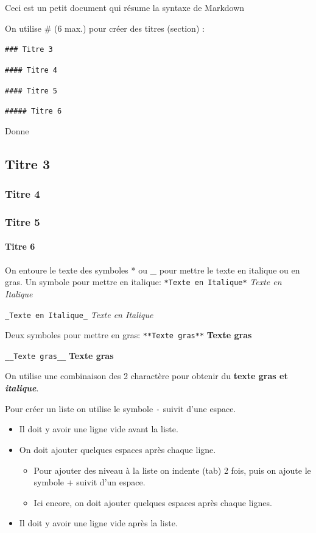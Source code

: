 \documentclass[
  12pt,
]{book}
\providecommand{\tightlist}{%
  \setlength{\itemsep}{0pt}\setlength{\parskip}{0pt}}
\begin{document}
Ceci est un petit document qui résume la syntaxe de Markdown

On utilise \# (6 max.) pour créer des titres (section) :

\texttt{\#\#\#\ Titre\ 3}

\texttt{\#\#\#\#\ Titre\ 4}

\texttt{\#\#\#\#\ Titre\ 5}

\texttt{\#\#\#\#\#\ Titre\ 6}

Donne

\hypertarget{titre-3}{%
\subsection{Titre 3}\label{titre-3}}

\hypertarget{titre-4}{%
\subsubsection{Titre 4}\label{titre-4}}

\hypertarget{titre-5}{%
\subsubsection{Titre 5}\label{titre-5}}

\hypertarget{titre-6}{%
\paragraph{Titre 6}\label{titre-6}}

On entoure le texte des symboles * ou \_ pour mettre le texte en italique ou en gras.
Un symbole pour mettre en italique:
\texttt{*Texte\ en\ Italique*}
\emph{Texte en Italique}

\texttt{\_Texte\ en\ Italique\_}
\emph{Texte en Italique}

Deux symboles pour mettre en gras:
\texttt{**Texte\ gras**}
\textbf{Texte gras}

\texttt{\_\_Texte\ gras\_\_}
\textbf{Texte gras}

On utilise une combinaison des 2 charactère pour obtenir du \textbf{texte gras et \emph{italique}}.

Pour créer un liste on utilise le symbole \texttt{-} suivit d'une espace.

\begin{itemize}
\tightlist
\item
  Il doit y avoir une ligne vide avant la liste.
\item
  On doit ajouter quelques espaces après chaque ligne.

  \begin{itemize}
  \tightlist
  \item
    Pour ajouter des niveau à la liste on indente (tab) 2 fois, puis on ajoute le symbole + suivit d'un espace.
  \item
    Ici encore, on doit ajouter quelques espaces après chaque lignes.
  \end{itemize}
\item
  Il doit y avoir une ligne vide après la liste.
\end{itemize}
\end{document}
